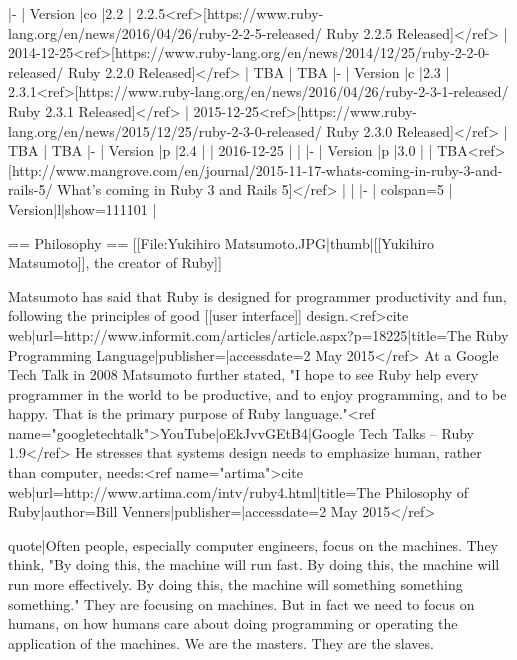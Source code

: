 {|-
| {{Version |co |2.2}}
| 2.2.5<ref>[https://www.ruby-lang.org/en/news/2016/04/26/ruby-2-2-5-released/ Ruby 2.2.5 Released]</ref>
| 2014-12-25<ref>[https://www.ruby-lang.org/en/news/2014/12/25/ruby-2-2-0-released/ Ruby 2.2.0 Released]</ref>
| {{TBA}}
| {{TBA}}
|-
| {{Version |c |2.3}}
| 2.3.1<ref>[https://www.ruby-lang.org/en/news/2016/04/26/ruby-2-3-1-released/ Ruby 2.3.1 Released]</ref>
| 2015-12-25<ref>[https://www.ruby-lang.org/en/news/2015/12/25/ruby-2-3-0-released/ Ruby 2.3.0 Released]</ref>
| {{TBA}}
| {{TBA}}
|-
| {{Version |p |2.4}}
|
| 2016-12-25
|
|
|-
| {{Version |p |3.0}}
|
| {{TBA}}<ref>[http://www.mangrove.com/en/journal/2015-11-17-whats-coming-in-ruby-3-and-rails-5/ What’s coming in Ruby 3 and Rails 5]</ref>
|
|
|-
| colspan=5 | {{Version|l|show=111101}}
|}

== Philosophy ==
[[File:Yukihiro Matsumoto.JPG|thumb|[[Yukihiro Matsumoto]], the creator of Ruby]]

Matsumoto has said that Ruby is designed for programmer productivity and fun, following the principles of good [[user interface]] design.<ref>{{cite web|url=http://www.informit.com/articles/article.aspx?p=18225|title=The Ruby Programming Language|publisher=|accessdate=2 May 2015}}</ref> At a Google Tech Talk in 2008 Matsumoto further stated, "I hope to see Ruby help every programmer in the world to be productive, and to enjoy programming, and to be happy. That is the primary purpose of Ruby language."<ref name="googletechtalk">{{YouTube|oEkJvvGEtB4|Google Tech Talks – Ruby 1.9}}</ref> He stresses that systems design needs to emphasize human, rather than computer, needs:<ref name="artima">{{cite web|url=http://www.artima.com/intv/ruby4.html|title=The Philosophy of Ruby|author=Bill Venners|publisher=|accessdate=2 May 2015}}</ref>

{{quote|Often people, especially computer engineers, focus on the machines. They think, "By doing this, the machine will run fast. By doing this, the machine will run more effectively. By doing this, the machine will something something something." They are focusing on machines. But in fact we need to focus on humans, on how humans care about doing programming or operating the application of the machines. We are the masters. They are the slaves.}}

